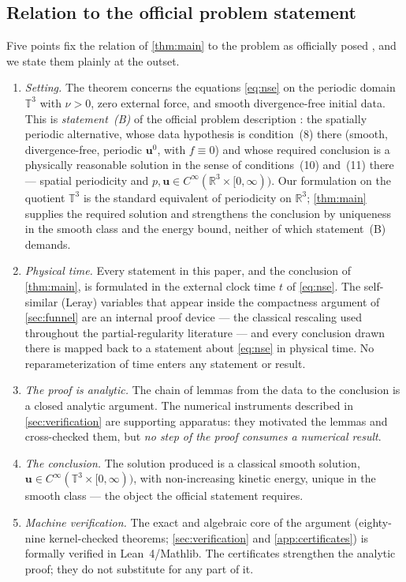 \documentclass[11pt,letterpaper]{amsart}
\theoremstyle{definition}
\theoremstyle{remark}
\newcommand{\TT}{\mathbb{T}}
\newcommand{\RR}{\mathbb{R}}
\newcommand{\uu}{\boldsymbol{u}}
\begin{document}
\subsection{Relation to the official problem statement}\label{subsec:clay}
Five points fix the relation of \cref{thm:main} to the problem as officially posed
\cite{Fefferman2006}, and we state them plainly at the outset.

\begin{enumerate}[label=(\roman*),itemsep=2pt]
\item \emph{Setting.} The theorem concerns the equations \eqref{eq:nse} on the periodic
domain $\TT^3$ with $\nu>0$, zero external force, and smooth divergence-free initial
data. This is \emph{statement~(B)} of the official problem description
\cite{Fefferman2006}: the spatially periodic alternative, whose data hypothesis is
condition~(8) there (smooth, divergence-free, periodic $\uu^0$, with $f\equiv0$) and
whose required conclusion is a physically reasonable solution in the sense of
conditions~(10) and~(11) there --- spatial periodicity and
$p,\uu\in C^\infty(\RR^3\times[0,\infty))$. Our formulation on the quotient $\TT^3$
is the standard equivalent of periodicity on $\RR^3$; \cref{thm:main} supplies the
required solution and strengthens the conclusion by uniqueness in the smooth class and
the energy bound, neither of which statement~(B) demands.
\item \emph{Physical time.} Every statement in this paper, and the conclusion of
\cref{thm:main}, is formulated in the external clock time $t$ of \eqref{eq:nse}. The
self-similar (Leray) variables that appear inside the compactness argument of
\cref{sec:funnel} are an internal proof device --- the classical rescaling used
throughout the partial-regularity literature \cite{CKN1982,NRS1996,Tsai1998} --- and
every conclusion drawn there is mapped back to a statement about \eqref{eq:nse} in
physical time. No reparameterization of time enters any statement or result.
\item \emph{The proof is analytic.} The chain of lemmas from the data to the conclusion
is a closed analytic argument. The numerical instruments described in
\cref{sec:verification} are supporting apparatus: they motivated the lemmas and
cross-checked them, but \emph{no step of the proof consumes a numerical result}.
\item \emph{The conclusion.} The solution produced is a classical smooth solution,
$\uu\in C^\infty(\TT^3\times[0,\infty))$, with non-increasing kinetic energy, unique in
the smooth class --- the object the official statement requires.
\item \emph{Machine verification.} The exact and algebraic core of the argument
(eighty-nine kernel-checked theorems; \cref{sec:verification} and
\cref{app:certificates}) is formally verified in Lean~4/Mathlib. The certificates
strengthen the analytic proof; they do not substitute for any part of it.
\end{enumerate}
\end{document}
